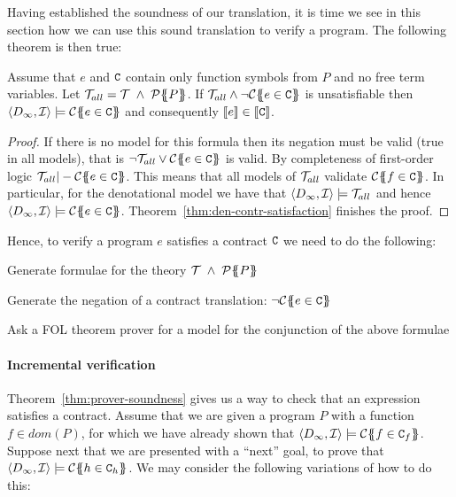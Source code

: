 Having established the soundness of our translation, it is time 
we see in this section how we can use this sound translation to verify a program. 
The following theorem is then true:

\begin{theorem}[Soundness]\label{thm:prover-soundness}
Assume that $e$ and $\Ct$ contain only function symbols from $P$ and no free term variables.
Let $\Th_{all} = \Th\;\land\;\ptrans{}{P}$. 
If $\Th_{all} \land \neg\ctrans{\Sigma}{P}{e \in \Ct}$ is unsatisfiable 
then $\langle D_\infty,{\cal I}\rangle \models \ctrans{\Sigma}{P}{e \in \Ct}$ and 
consequently $\dbrace{e} \in \dbrace{\Ct}$.
\end{theorem}
\begin{proof}
If there is no model for this formula then its negation must be valid (true in all models), that 
is $ \neg \Th_{all} \lor \ctrans{\Sigma}{P}{e \in \Ct}$ is valid. By completeness
of first-order logic $\Th_{all} |- \ctrans{\Sigma}{P}{e \in \Ct}$. This means 
that all models of $\Th_{all}$ validate $\ctrans{\Sigma}{P}{f \in \Ct}$. In particular, 
for the denotational model we have that $\langle D_\infty,{\cal I}\rangle \models \Th_{all}$ 
and hence $\langle D_\infty,{\cal I} \rangle \models \ctrans{\Sigma}{P}{e \in \Ct}$. 
Theorem~\ref{thm:den-contr-satisfaction} finishes the proof.
\end{proof}

Hence, to verify a program $e$ satisfies a contract $\Ct$ we need to do the following:
\begin{itemize*}
  \item Generate formulae for the theory $\Th\;\land\;\ptrans{}{P}$
  \item Generate the negation of a contract translation: $\neg\ctrans{\Sigma}{P}{e \in \Ct}$
  \item Ask a FOL theorem prover for a model for the conjunction of the above formulae
\end{itemize*}

\paragraph{Incremental verification}

Theorem~\ref{thm:prover-soundness} gives us a way to check that an expression satisfies a 
contract. Assume that we are given a program $P$ with a function $f \in dom(P)$, for which 
we have already shown that $\langle D_\infty,{\cal I}\rangle \models \ctrans{\Sigma}{P}{f \in \Ct_f}$.
Suppose next that we are presented with a ``next'' goal, to prove that 
$\langle D_\infty,{\cal I}\rangle \models \ctrans{\Sigma}{P}{h \in \Ct_h}$. 
We may consider the following variations of how to do this:

